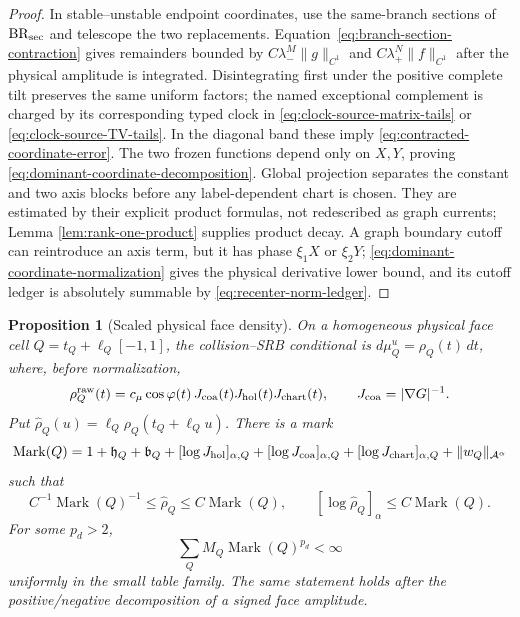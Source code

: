 \documentclass[11pt]{article}
\newtheorem{proposition}[theorem]{Proposition}
\begin{document}
\begin{proof}
In stable--unstable endpoint coordinates, use the same-branch sections of
$\mathrm{BR}_{\rm sec}$ and telescope the two replacements.
Equation~\eqref{eq:branch-section-contraction} gives remainders bounded by
$C\lambda_-^M\|g\|_{C^1}$ and $C\lambda_+^N\|f\|_{C^1}$ after the physical
amplitude is integrated.  Disintegrating first under the positive complete
tilt preserves the same uniform factors; the named exceptional complement is
charged by its corresponding typed clock in
\eqref{eq:clock-source-matrix-tails} or
\eqref{eq:clock-source-TV-tails}.  In the diagonal band these imply
\eqref{eq:contracted-coordinate-error}.  The two frozen functions depend
only on $X,Y$, proving \eqref{eq:dominant-coordinate-decomposition}.  Global
projection separates the constant and two axis blocks before any
label-dependent chart is chosen.  They are estimated by their explicit
product formulas, not redescribed as graph currents; Lemma
\ref{lem:rank-one-product} supplies product decay.  A graph boundary
cutoff can reintroduce an axis term, but it has phase $\xi_1X$ or $\xi_2Y$;
\eqref{eq:dominant-coordinate-normalization} gives the physical derivative
lower bound, and its cutoff ledger is absolutely summable by
\eqref{eq:recenter-norm-ledger}.
\end{proof}

\begin{proposition}[Scaled physical face density]
\label{prop:scaled-face-density}
On a homogeneous physical face cell
\(Q=t_Q+\ell_Q[-1,1]\), the collision--SRB conditional is
\(d\mu_Q^u=\rho_Q(t)\,dt\), where, before normalization,
\begin{equation}
\label{eq:face-conditional-density}
 \rho_Q^{\rm raw}(t)=c_\mu\cos\varphi(t)\,J_{\rm coa}(t)
 J_{\rm hol}(t)J_{\rm chart}(t),
 \qquad J_{\rm coa}=|\nabla G|^{-1}.
\end{equation}
Put
\(\widehat\rho_Q(u)=\ell_Q\rho_Q(t_Q+\ell_Qu)\).  There is a mark
\begin{equation}
\label{eq:density-mark-definition}
 \operatorname{Mark}(Q)=
 1+\mathfrak h_Q+\mathfrak b_Q+
 [\log J_{\rm hol}]_{\alpha,Q}
 +[\log J_{\rm coa}]_{\alpha,Q}
 +[\log J_{\rm chart}]_{\alpha,Q}
 +\|w_Q\|_{\mathcal A^\alpha}
\end{equation}
such that
\begin{equation}
\label{eq:scaled-density-bound}
 C^{-1}\operatorname{Mark}(Q)^{-1}
 \le\widehat\rho_Q\le C\operatorname{Mark}(Q),\qquad
 [\log\widehat\rho_Q]_\alpha
 \le C\operatorname{Mark}(Q).
\end{equation}
For some \(p_d>2\),
\begin{equation}
\label{eq:density-mark-moment}
 \sum_Q M_Q\operatorname{Mark}(Q)^{p_d}<\infty
\end{equation}
uniformly in the small table family.  The same statement holds after the
positive/negative decomposition of a signed face amplitude.
\end{proposition}
\end{document}

